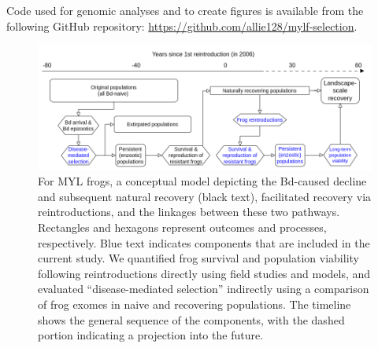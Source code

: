 \documentclass[9pt,twocolumn,twoside,lineno]{pnas-new}
\begin{document}
{Code used for genomic analyses and to create figures is available from
the following GitHub repository:
\url{https://github.com/allie128/mylf-selection}.

}


\showmatmethods{} %


\showacknow{} %



\clearpage
\begin{figure}

{\centering \includegraphics[width=\textwidth]{figures/conceptual_model.png}

}

\caption{\label{fig-recovery-model}For MYL frogs, a conceptual model
depicting the Bd-caused decline and subsequent natural recovery (black
text), facilitated recovery via reintroductions, and the linkages
between these two pathways. Rectangles and hexagons represent outcomes
and processes, respectively. Blue text indicates components that are
included in the current study. We quantified frog survival and
population viability following reintroductions directly using field
studies and models, and evaluated ``disease-mediated selection''
indirectly using a comparison of frog exomes in naive and recovering
populations. The timeline shows the general sequence of the components,
with the dashed portion indicating a projection into the future.}

\end{figure}
\end{document}
